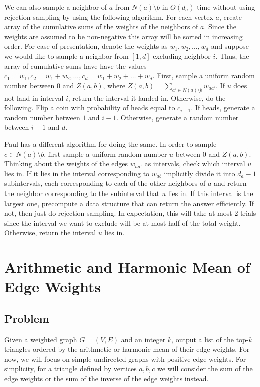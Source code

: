 \documentclass{article}
\begin{document}
We can also sample a neighbor of $a$ from $N(a) 
\setminus b$ in
$O(d_a)$ time without using rejection sampling by
using the following algorithm.
For each vertex $a$, create
array of the cumulative sums of the
weights of the neighbors of $a$. Since the weights
are assumed to be non-negative this array will be
sorted in increasing order. For ease of 
presentation, denote the weights as $w_1, w_2, \dots,
w_d$ and suppose we would like to sample a neighbor
from $[1, d]$ excluding neighbor $i$. Thus, the
array of cumulative sums have 
have the values $c_1=w_1, c_2=w_1+w_2,
\dots, c_d=w_1+w_2+\dots+w_d$. First, sample a uniform
random number between 0 and $Z(a,b)$, where $Z(a,b) = 
\sum\limits_{a'\in N(a) \setminus b} w_{aa'}$.
If $u$ does not land in interval $i$, return the
interval it landed in.
Otherwise, do the following. Flip a coin with probability
of heads equal to $c_{i-1}$. If heads, generate a random
number between $1$ and $i-1$. Otherwise, generate a random
number between $i+1$ and $d$.

Paul has a different 
algorithm for doing the same. In order to sample
$c \in N(a) \setminus b$, first sample a uniform random
number $u$ between 0 and $Z(a,b)$.
Thinking about the weights of the edges $w_{aa'}$ as
intervals, check which interval $u$ lies in. If it lies
in the interval corresponding to $w_{ab}$ implicitly
divide it into $d_a - 1$ subintervals, each
corresponding to each of the other neighbors of $a$ and
return the neighbor corresponding to the subinterval
that $u$ lies in. If this interval is the largest one,
precompute a data structure that can return the answer
efficiently. If not, then just do rejection sampling.
In expectation, this will take at most 2 trials since
the interval we want to exclude will be at most half of the
total weight.
Otherwise, return the interval
$u$ lies in.


\section{Arithmetic and Harmonic Mean of Edge Weights}

\subsection{Problem}
Given a weighted graph $G = (V, E)$ and an integer $k$, 
output a list
of the top-$k$ triangles ordered by the arithmetic or 
harmonic mean of their edge 
weights. For now, we will focus on simple undirected graphs 
with positive edge weights. For simplicity, for a triangle
defined by vertices $a, b, c$ we will consider the sum
of the edge weights or the sum of the inverse of the edge
weights instead.
\end{document}
